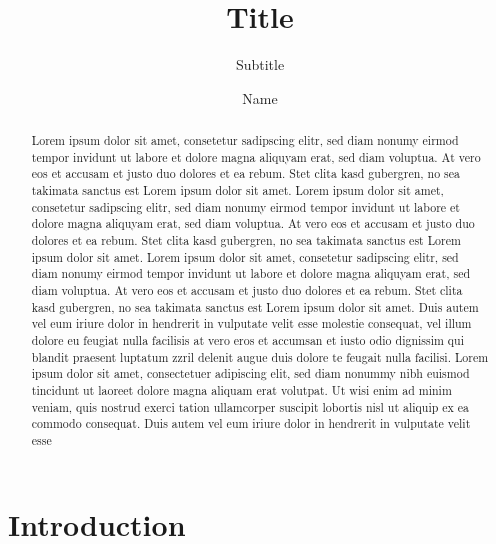 \documentclass[a4paper,format=sigconf,natbib=false,nonacm]{acmart}
\title{Title}
\subtitle{Subtitle}
\author{Name}
\begin{document}
\begin{abstract}
    Lorem ipsum dolor sit amet, consetetur sadipscing elitr, sed diam nonumy eirmod tempor invidunt ut labore et dolore magna aliquyam erat, sed diam voluptua. At vero eos et accusam et justo duo dolores et ea rebum. Stet clita kasd gubergren, no sea takimata sanctus est Lorem ipsum dolor sit amet. Lorem ipsum dolor sit amet, consetetur sadipscing elitr, sed diam nonumy eirmod tempor invidunt ut labore et dolore magna aliquyam erat, sed diam voluptua. At vero eos et accusam et justo duo dolores et ea rebum. Stet clita kasd gubergren, no sea takimata sanctus est Lorem ipsum dolor sit amet. Lorem ipsum dolor sit amet, consetetur sadipscing elitr, sed diam nonumy eirmod tempor invidunt ut labore et dolore magna aliquyam erat, sed diam voluptua. At vero eos et accusam et justo duo dolores et ea rebum. Stet clita kasd gubergren, no sea takimata sanctus est Lorem ipsum dolor sit amet.   
    Duis autem vel eum iriure dolor in hendrerit in vulputate velit esse molestie consequat, vel illum dolore eu feugiat nulla facilisis at vero eros et accumsan et iusto odio dignissim qui blandit praesent luptatum zzril delenit augue duis dolore te feugait nulla facilisi. Lorem ipsum dolor sit amet, consectetuer adipiscing elit, sed diam nonummy nibh euismod tincidunt ut laoreet dolore magna aliquam erat volutpat.   
    Ut wisi enim ad minim veniam, quis nostrud exerci tation ullamcorper suscipit lobortis nisl ut aliquip ex ea commodo consequat. Duis autem vel eum iriure dolor in hendrerit in vulputate velit esse
\end{abstract}

\maketitle

\section{Introduction}



\printbibliography{}
\end{document}
